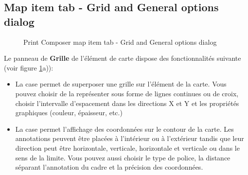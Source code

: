 \subsection{Map item tab - Grid and General options dialog}

\begin{figure}[ht]
\centering
   \hspace{1cm}
   \caption{Print Composer map item tab - Grid and General options dialog \nixcaption}\label{fig:sec_map_dialog}
\end{figure}
\FloatBarrier

Le panneau de \textbf{Grille} de l'élément de carte dispose des fonctionnalités suivante (voir figure \ref{fig:sec_map_dialog}a)):

\begin{itemize}[label=--]
\item La case  permet de superposer une grille sur l'élément de la carte. Vous pouvez choisir de la représenter sous forme de lignes continues ou de croix, choisir l'intervalle d'espacement dans les directions X et Y et les propriétés graphiques (couleur, épaisseur, etc.)
\item La case  permet l'affichage des coordonnées sur le contour de la carte. Les annotations peuvent être placées à l'intérieur ou à l'extérieur tandis que leur direction peut être horizontale, verticale, horizontale et verticale ou dans le sens de la limite. Vous pouvez aussi choisir le type de police, la distance séparant l'annotation du cadre et la précision des coordonnées. 
\end{itemize}


